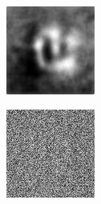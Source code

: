 \begin{figure}[H]
\begin{subfigure}[t]{0.13\textwidth}
  \end{subfigure}
  \begin{subfigure}[t]{0.13\textwidth}
    \centering
    \includegraphics[width=\linewidth]{img/one-trial/intermediate-cnnv3/prediction_1.png}
  \end{subfigure}
  \begin{subfigure}[t]{0.13\textwidth}
    \centering
    \includegraphics[width=\linewidth]{img/one-trial/intermediate-cnnv4/intermediate_1.png}

\end{subfigure}
\end{figure}
